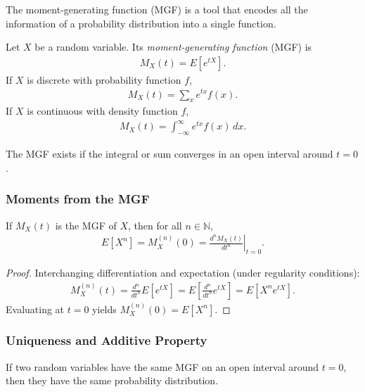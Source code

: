 The moment-generating function (MGF) is a tool that encodes all the information of a probability distribution into a single function.

\begin{definicion}
Let $X$ be a random variable. Its \emph{moment-generating function} (MGF) is
\begin{align}
 \label{eq:2.8.11}
 M_X(t) = E\!\left[e^{tX}\right].
\end{align}
If $X$ is discrete with probability function $f$,
\begin{align}
 M_X(t) = \sum_x e^{tx} f(x).
\end{align}
If $X$ is continuous with density function $f$,
\begin{align}
 M_X(t) = \int_{-\infty}^{\infty} e^{tx} f(x)\,dx.
\end{align}
\end{definicion}

The MGF exists if the integral or sum converges in an open interval around $t=0$.

\subsubsection{Moments from the MGF}

\begin{teorema}
If $M_X(t)$ is the MGF of $X$, then for all $n \in \mathbb{N}$,
\begin{align}
 \label{eq:2.8.12}
 E\!\left[X^n\right] = M_X^{(n)}(0) = \left.\frac{d^n M_X(t)}{dt^n}\right|_{t=0}.
\end{align}
\end{teorema}

\begin{proof}
Interchanging differentiation and expectation (under regularity conditions):
\begin{align}
 M_X^{(n)}(t) = \frac{d^n}{dt^n}E[e^{tX}] = E\!\left[\frac{d^n}{dt^n}e^{tX}\right]
 = E\!\left[X^n e^{tX}\right].
\end{align}
Evaluating at $t=0$ yields $M_X^{(n)}(0) = E[X^n]$.
\end{proof}

\subsubsection{Uniqueness and Additive Property}

\begin{teorema}[Uniqueness]
If two random variables have the same MGF on an open interval around $t=0$, then they have the same probability distribution.
\end{teorema}

